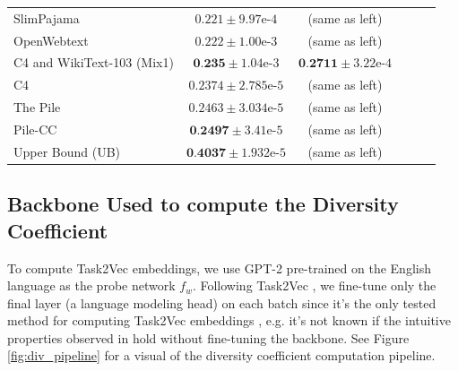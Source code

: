 \documentclass[10pt]{article} %
\begin{document}
\begin{table}[t]
\begin{center}
\begin{small}
\begin{sc}
\begin{tabular}{lccccr}
SlimPajama & $0.221 \pm 9.97\textrm{e-}4$ & (same as left) \\ %
OpenWebtext & $ 0.222 \pm  1.00\textrm{e-}3 $ & (same as left) \\ %

C4 and WikiText-103 (Mix1) & $ \textbf{0.235} \pm  1.04$\textrm{e-}3 & $\textbf{0.2711} \pm 3.22\textrm{e-}4$\\ %
C4 & $0.2374 \pm 2.785\textrm{e-}5$ & (same as left) \\

The Pile & $0.2463 \pm 3.034\textrm{e-}5$ & (same as left) \\
Pile-CC & $\textbf{0.2497} \pm 3.41\textrm{e-}5$ & (same as left) \\

Upper Bound (UB) & $\textbf{0.4037} \pm 1.932\textrm{e-}5$ & (same as left)\\
\bottomrule
\end{tabular}
\label{tab:div}
\end{sc}
\end{small}
\end{center}
\vskip -0.1in

\end{table}

\subsection{Backbone Used to compute the Diversity Coefficient}
To compute Task2Vec embeddings, we use GPT-2 \cite{gpt2} pre-trained on the English language as the probe network $f_w$. 
Following Task2Vec \citep{task2vec}, we fine-tune only the final layer (a language modeling head) on each batch since it's the only tested method for computing Task2Vec embeddings \cite{task2vec, curse_low_div, miranda2023pretraining}, e.g. it's not known if the intuitive properties observed in \citep{task2vec} hold without fine-tuning the backbone. 
See Figure \ref{fig:div_pipeline} for a visual of the diversity coefficient computation pipeline.
\end{document}
